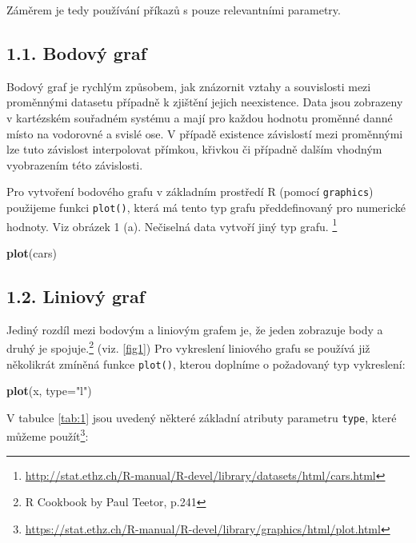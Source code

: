 \documentclass[]{article}
\newenvironment{Shaded}{\begin{snugshade}}{\end{snugshade}}
\newcommand{\KeywordTok}[1]{\textcolor[rgb]{0.13,0.29,0.53}{\textbf{#1}}}
\newcommand{\DataTypeTok}[1]{\textcolor[rgb]{0.13,0.29,0.53}{#1}}
\newcommand{\StringTok}[1]{\textcolor[rgb]{0.31,0.60,0.02}{#1}}
\newcommand{\NormalTok}[1]{#1}
\let\rmarkdownfootnote\footnote%
\def\footnote{\protect\rmarkdownfootnote}
\theoremstyle{definition}
\theoremstyle{definition}
\theoremstyle{remark}
\begin{document}
Záměrem je tedy používání příkazů s pouze relevantními parametry.

\subsection{1.1. Bodový graf}\label{bodovy-graf}

Bodový graf je rychlým způsobem, jak znázornit vztahy a souvislosti mezi
proměnnými datasetu případně k zjištění jejich neexistence. Data jsou
zobrazeny v kartézském souřadném systému a mají pro každou hodnotu
proměnné danné místo na vodorovné a svislé ose. V případě existence
závislostí mezi proměnnými lze tuto závislost interpolovat přímkou,
křivkou či případně dalším vhodným vyobrazením této závislosti.

Pro vytvoření bodového grafu v základním prostředí R (pomocí
\texttt{graphics}) použijeme funkci \texttt{plot()}, která má tento typ
grafu předdefinovaný pro numerické hodnoty. Viz obrázek 1 (a). Nečiselná
data vytvoří jiný typ grafu. \footnote{\url{http://stat.ethz.ch/R-manual/R-devel/library/datasets/html/cars.html}}

\begin{Shaded}
\begin{Highlighting}[]
\KeywordTok{plot}\NormalTok{(cars)}
\end{Highlighting}
\end{Shaded}

\subsection{1.2. Liniový graf}\label{liniovy-graf}

Jediný rozdíl mezi bodovým a liniovým grafem je, že jeden zobrazuje body
a druhý je spojuje.\footnote{R Cookbook by Paul Teetor, p.241} (viz.
\autoref{fig1}) Pro vykreslení liniového grafu se používá již několikrát
zmíněná funkce \texttt{plot()}, kterou doplníme o požadovaný typ
vykreslení:

\begin{Shaded}
\begin{Highlighting}[]
\KeywordTok{plot}\NormalTok{(x, }\DataTypeTok{type=}\StringTok{"l"}\NormalTok{)}
\end{Highlighting}
\end{Shaded}

V tabulce \ref{tab:1} jsou uvedený některé základní atributy parametru
\texttt{type}, které můžeme použít\footnote{\url{https://stat.ethz.ch/R-manual/R-devel/library/graphics/html/plot.html}}:
\end{document}
